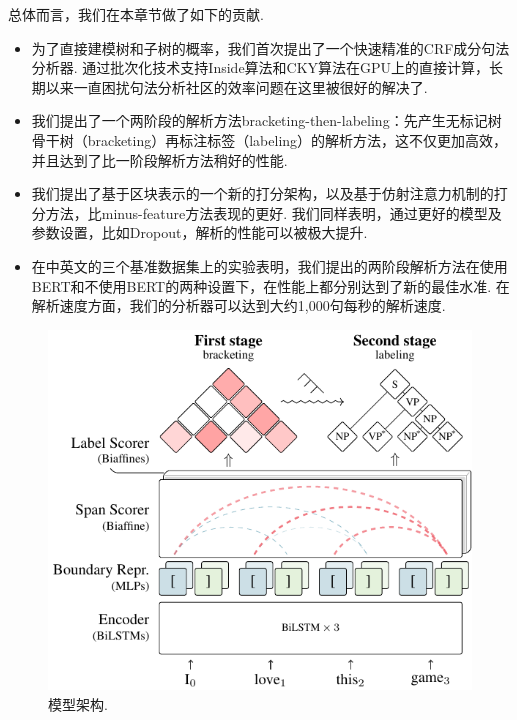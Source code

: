 总体而言，我们在本章节做了如下的贡献.
\begin{itemize}
  \item 为了直接建模树和子树的概率，我们首次提出了一个快速精准的CRF成分句法分析器.
        通过批次化技术支持Inside算法和CKY算法在GPU上的直接计算，长期以来一直困扰句法分析社区的效率问题在这里被很好的解决了.

  \item 我们提出了一个两阶段的解析方法bracketing-then-labeling：先产生无标记树骨干树（bracketing）再标注标签（labeling）的解析方法，这不仅更加高效，并且达到了比一阶段解析方法稍好的性能.

  \item 我们提出了基于区块表示的一个新的打分架构，以及基于仿射注意力机制的打分方法，比minus-feature方法表现的更好.
        我们同样表明，通过更好的模型及参数设置，比如Dropout，解析的性能可以被极大提升.

  \item 在中英文的三个基准数据集上的实验表明，我们提出的两阶段解析方法在使用BERT和不使用BERT\citep{devlin-etal-2019-bert}的两种设置下，在性能上都分别达到了新的最佳水准.
        在解析速度方面，我们的分析器可以达到大约1,000句每秒的解析速度.
\end{itemize}

\begin{figure}[tb]
  \centering
  \includegraphics [scale=1.1]{figures/con-framework.pdf}
  \caption{模型架构.}
  \label{fig:con-framework}
\end{figure}

